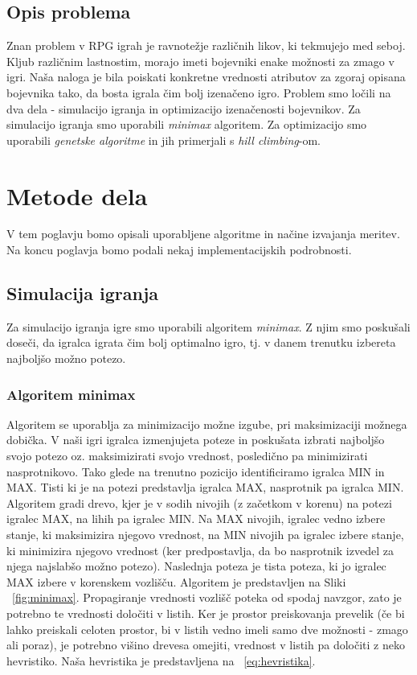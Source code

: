 \documentclass[12pt,a4paper,openany]{book}
\begin{document}
\section{Opis problema}
Znan problem v RPG igrah je ravnotežje različnih likov, ki tekmujejo med seboj. Kljub različnim lastnostim, morajo imeti bojevniki enake možnosti za zmago v igri. Naša naloga je bila poiskati konkretne vrednosti atributov za zgoraj opisana bojevnika tako, da bosta igrala čim bolj izenačeno igro. Problem smo ločili na dva dela - simulacijo igranja in optimizacijo izenačenosti bojevnikov. Za simulacijo igranja smo uporabili \textit{minimax} algoritem. Za optimizacijo smo uporabili \textit{genetske algoritme} in jih primerjali s \textit{hill climbing}-om.

\chapter{Metode dela}
V tem poglavju bomo opisali uporabljene algoritme in načine izvajanja meritev. Na koncu poglavja bomo podali nekaj implementacijskih podrobnosti.

\section{Simulacija igranja}
Za simulacijo igranja igre smo uporabili algoritem \textit{minimax}. Z njim smo poskušali doseči, da igralca igrata čim bolj optimalno igro, tj. v danem trenutku izbereta najboljšo možno potezo.

\subsection{Algoritem minimax}
Algoritem se uporablja za minimizacijo možne izgube, pri maksimizaciji možnega dobička. V naši igri igralca izmenjujeta poteze in poskušata izbrati najboljšo svojo potezo oz. maksimizirati svojo vrednost, posledično pa minimizirati nasprotnikovo. Tako glede na trenutno pozicijo identificiramo igralca MIN in MAX. Tisti ki je na potezi predstavlja igralca MAX, nasprotnik pa igralca MIN. Algoritem gradi drevo, kjer je v sodih nivojih (z začetkom v korenu) na potezi igralec MAX, na lihih pa igralec MIN. Na MAX nivojih, igralec vedno izbere stanje, ki maksimizira njegovo vrednost, na MIN nivojih pa igralec izbere stanje, ki minimizira njegovo vrednost (ker predpostavlja, da bo nasprotnik izvedel za njega najslabšo možno potezo). Naslednja poteza je tista poteza, ki jo igralec MAX izbere v korenskem vozlišču. Algoritem je predstavljen na Sliki ~\ref{fig:minimax}. Propagiranje vrednosti vozlišč poteka od spodaj navzgor, zato je potrebno te vrednosti določiti v listih. Ker je prostor preiskovanja prevelik (če bi lahko preiskali celoten prostor, bi v listih vedno imeli samo dve možnosti - zmago ali poraz), je potrebno višino drevesa omejiti, vrednost v listih pa določiti z neko hevristiko. Naša hevristika je predstavljena na ~\ref{eq:hevristika}. 
\end{document}
